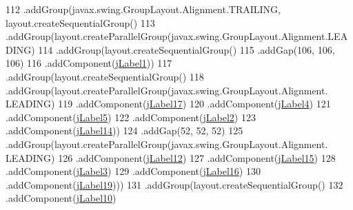 \begin{DoxyCode}
112                     .addGroup(javax.swing.GroupLayout.Alignment.TRAILING, layout.createSequentialGroup()
113                         .addGroup(layout.createParallelGroup(javax.swing.GroupLayout.Alignment.LEADING)
114                             .addGroup(layout.createSequentialGroup()
115                                 .addGap(106, 106, 106)
116                                 .addComponent(\mbox{\hyperlink{classsoftware_1_1validornotvalid_ad6cb9e904f7cb7d49c96c66285d81f2f}{jLabel1}}))
117                             .addGroup(layout.createSequentialGroup()
118                                 .addGroup(layout.createParallelGroup(javax.swing.GroupLayout.Alignment.
      LEADING)
119                                     .addComponent(\mbox{\hyperlink{classsoftware_1_1validornotvalid_a5db46900582e8dd06da0cae9038921c9}{jLabel17}})
120                                     .addComponent(\mbox{\hyperlink{classsoftware_1_1validornotvalid_a8e62567b7da0a8b4c83016569d52963e}{jLabel4}})
121                                     .addComponent(\mbox{\hyperlink{classsoftware_1_1validornotvalid_a4759a0841dcab0fa20a6e40de41546d0}{jLabel5}})
122                                     .addComponent(\mbox{\hyperlink{classsoftware_1_1validornotvalid_a896d5beda5159ad343db01b03383b0f5}{jLabel2}})
123                                     .addComponent(\mbox{\hyperlink{classsoftware_1_1validornotvalid_a898329c2e85620214a3e83a8ec229895}{jLabel14}}))
124                                 .addGap(52, 52, 52)
125                                 .addGroup(layout.createParallelGroup(javax.swing.GroupLayout.Alignment.
      LEADING)
126                                     .addComponent(\mbox{\hyperlink{classsoftware_1_1validornotvalid_a5a7bbbddab22b0193c6b6776c7aa5f6b}{jLabel12}})
127                                     .addComponent(\mbox{\hyperlink{classsoftware_1_1validornotvalid_aa1a81f594817fe87cc5fbbd85d33aa8a}{jLabel15}})
128                                     .addComponent(\mbox{\hyperlink{classsoftware_1_1validornotvalid_a7b2e42b02447e6b29b0c4626ee773c0d}{jLabel3}})
129                                     .addComponent(\mbox{\hyperlink{classsoftware_1_1validornotvalid_a071acd2388aa23129a2da2e239c494d8}{jLabel16}})
130                                     .addComponent(\mbox{\hyperlink{classsoftware_1_1validornotvalid_a744ece24d9517e67e29e9c200e76b055}{jLabel19}})))
131                             .addGroup(layout.createSequentialGroup()
132                                 .addComponent(\mbox{\hyperlink{classsoftware_1_1validornotvalid_a2255215afcbe0670ccbeec10ca5c7aca}{jLabel10}})

\end{DoxyCode}
